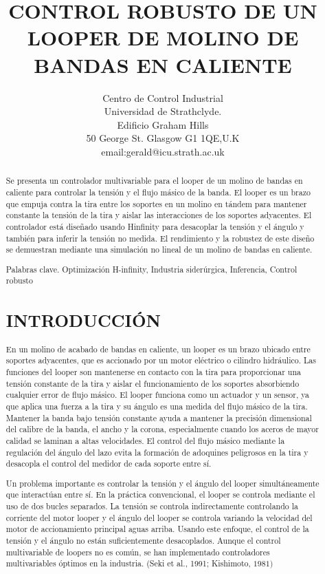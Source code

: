\documentclass[10pt]{article}
\title{CONTROL ROBUSTO DE UN LOOPER DE MOLINO DE BANDAS EN CALIENTE }
\author{Centro de Control Industrial\\
Universidad de Strathclyde.\\
Edificio Graham Hills\\
50 George St. Glasgow G1 1QE,U.K\\
email:gerald@icu.strath.ac.uk}
\date{}
\begin{document}
\maketitle


\begin{abstract}
Se presenta un controlador multivariable para el looper de un molino de bandas en caliente para controlar la tensión y el flujo másico de la banda. El looper es un brazo que empuja contra la tira entre los soportes en un molino en tándem para mantener constante la tensión de la tira y aislar las interacciones de los soportes adyacentes. El controlador está diseñado usando Hinfinity para desacoplar la tensión y el ángulo y también para inferir la tensión no medida. El rendimiento y la robustez de este diseño se demuestran mediante una simulación no lineal de un molino de bandas en caliente.

Palabras clave. Optimización H-infinity, Industria siderúrgica, Inferencia, Control robusto

\section{INTRODUCCIÓN}
En un molino de acabado de bandas en caliente, un looper es un brazo ubicado entre soportes adyacentes, que es accionado por un motor eléctrico o cilindro hidráulico. Las funciones del looper son mantenerse en contacto con la tira para proporcionar una tensión constante de la tira y aislar el funcionamiento de los soportes absorbiendo cualquier error de flujo másico. El looper funciona como un actuador y un sensor, ya que aplica una fuerza a la tira y su ángulo es una medida del flujo másico de la tira. Mantener la banda bajo tensión constante ayuda a mantener la precisión dimensional del calibre de la banda, el ancho y la corona, especialmente cuando los aceros de mayor calidad se laminan a altas velocidades. El control del flujo másico mediante la regulación del ángulo del lazo evita la formación de adoquines peligrosos en la tira y desacopla el control del medidor de cada soporte entre sí.

Un problema importante es controlar la tensión y el ángulo del looper simultáneamente que interactúan entre sí. En la práctica convencional, el looper se controla mediante el uso de dos bucles separados. La tensión se controla indirectamente controlando la corriente del motor looper y el ángulo del looper se controla variando la velocidad del motor de accionamiento principal aguas arriba. Usando este enfoque, el control de la tensión y el ángulo no están suficientemente desacoplados. Aunque el control multivariable de loopers no es común, se han implementado controladores multivariables óptimos en la industria. (Seki et al., 1991; Kishimoto, $1981)$


\end{abstract}
\end{document}
